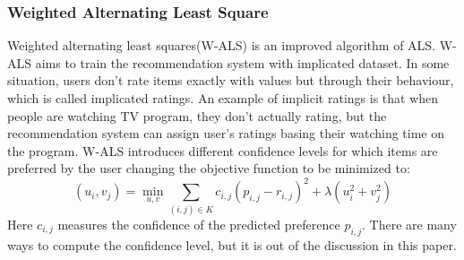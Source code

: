 \documentclass{sig-alternate-05-2015}
\begin{document}
\subsubsection{Weighted Alternating Least Square}
Weighted alternating least squares(W-ALS) is an improved algorithm of ALS. W-ALS aims to train the recommendation system with implicated dataset. In some situation, users don't rate items exactly with values but through their behaviour, which is called implicated ratings. An example of implicit ratings is that when people are watching TV program, they don't actually rating, but the recommendation system can assign user's ratings basing their watching time on the program. W-ALS introduces different confidence levels for which items are preferred by the user
changing the objective function to be minimized to:
\begin{equation}
    {(u_{i},v_{j}) = \min_{u,v} {\sum\limits_{(i,j) \in K} c_{i,j}{(p_{i,j} - r_{i,j})}^{2} + \lambda(u_{i}^{2} + v_{j}^{2}) }}
\end{equation}
Here $c_{i,j}$ measures the confidence of the predicted preference $p_{i,j}$. There are many ways to compute the confidence level, but it is out of the discussion in this paper.
\end{document}
